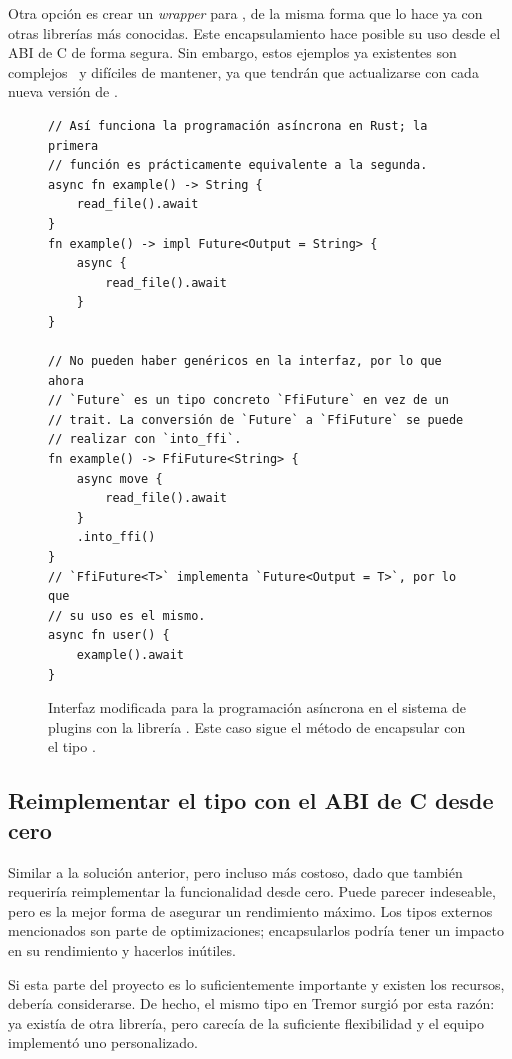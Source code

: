 Otra opción es crear un \emph{wrapper} para , de la misma forma
que lo hace ya \abistable con otras librerías más conocidas. Este
encapsulamiento hace posible su uso desde el ABI de C de forma segura. Sin
embargo, estos ejemplos ya existentes son complejos~\cite{complexwrapper} y
difíciles de mantener, ya que tendrán que actualizarse con cada nueva versión de
.

\begin{figure}
    \centering
    \begin{verbatim}
// Así funciona la programación asíncrona en Rust; la primera
// función es prácticamente equivalente a la segunda.
async fn example() -> String {
    read_file().await
}
fn example() -> impl Future<Output = String> {
    async {
        read_file().await
    }
}

// No pueden haber genéricos en la interfaz, por lo que ahora
// `Future` es un tipo concreto `FfiFuture` en vez de un
// trait. La conversión de `Future` a `FfiFuture` se puede
// realizar con `into_ffi`.
fn example() -> FfiFuture<String> {
    async move {
        read_file().await
    }
    .into_ffi()
}
// `FfiFuture<T>` implementa `Future<Output = T>`, por lo que
// su uso es el mismo.
async fn user() {
    example().await
}
    \end{verbatim}
    \caption{Interfaz modificada para la programación asíncrona en el sistema de
    plugins con la librería . Este caso sigue el método de
    encapsular  con el tipo .}%
    \label{fig:async_ffi}
\end{figure}

\subsection{Reimplementar el tipo con el ABI de C desde cero}

Similar a la solución anterior, pero incluso más costoso, dado que también
requeriría reimplementar la funcionalidad desde cero. Puede parecer indeseable,
pero es la mejor forma de asegurar un rendimiento máximo. Los tipos externos
mencionados son parte de optimizaciones; encapsularlos podría tener un impacto
en su rendimiento y hacerlos inútiles.

Si esta parte del proyecto es lo suficientemente importante y existen los
recursos, debería considerarse. De hecho, el mismo tipo  en Tremor
surgió por esta razón: ya existía  de otra librería, pero
carecía de la suficiente flexibilidad y el equipo implementó uno personalizado.

